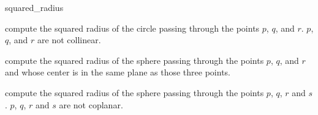 \begin{ccRefFunction}{squared_radius}

 {compute the squared radius of the circle passing through the points
 $p$, $q$, and $r$.  \ccPrecond $p$, $q$, and $r$ are not collinear.}

 {compute the squared radius of the sphere passing through the points $p$,
 $q$, and $r$ and whose center is in the same plane as those three points.}

 {compute the squared radius of the sphere passing through the points $p$,
 $q$, $r$ and $s$.  \ccPrecond $p$, $q$, $r$ and $s$ are not coplanar.}

\ccSeeAlso
{} \\
 \\

\end{ccRefFunction}
